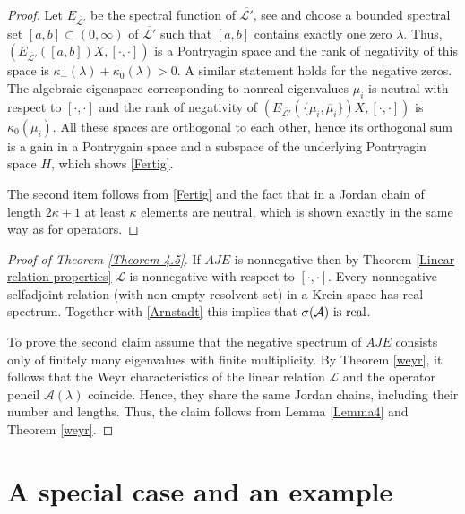 \documentclass{birkjour}
\theoremstyle{definition}
\theoremstyle{remark}
\newtheorem{rem}[thm]{Remark}
\numberwithin{equation}{section}
\newcommand{\R}{\mathbb R}
\newcommand{\A}{\mathcal A}
\newcommand{\Ll}{\mathcal L}
\begin{document}
\begin{proof}
Let $E_{\overline{\Ll'}}$ be the spectral function of $\overline{\Ll'}$, see \cite{KP15} and choose a bounded spectral set $[a,b] \subset (0,\infty)$ of $\overline{\Ll'}$ such that $[a,b]$ contains exactly one zero $\lambda.$ Thus, $(E_{\overline{\Ll'}}([a,b])X,[\cdot, \cdot])$ is a Pontryagin space and the rank of negativity of this space
is $\kappa_-(\lambda)+\kappa_0(\lambda)>0$. A similar statement holds for the negative zeros. The algebraic eigenspace corresponding to nonreal eigenvalues $\mu_i$ is neutral with respect to $[\cdot, \cdot]$ and the rank of negativity of $(E_{\overline{\Ll'}}(\{\mu_i, \overline{\mu}_i\})X,[\cdot, \cdot])$ is $\kappa_0(\mu_i)$. All these spaces are orthogonal to each other, hence its orthogonal sum is a gain in a Pontrygain space and a subspace of the underlying Pontryagin space $H$, which shows \eqref{Fertig}.

The second item follows from \eqref{Fertig} and the fact that in a Jordan chain of length $2\kappa +1$ at least $\kappa$ elements are neutral, which is shown exactly in the same way as for operators.
\end{proof}
\begin{proof}[Proof of Theorem \ref{Theorem 4.5}]
If $AJE$ is nonnegative then by Theorem \ref{Linear relation properties} $\Ll$ is nonnegative with respect to $[\cdot, \cdot]$. Every nonnegative selfadjoint relation
(with non empty resolvent set) in a Krein space has real spectrum. Together with \eqref{Arnstadt} this implies that $\sigma(\A) \ \hbox{is real}$.

To prove the second claim assume that the negative spectrum of $AJE$ consists only of finitely many eigenvalues with finite multiplicity.  By Theorem \ref{weyr}, it follows that the Weyr characteristics of the linear relation $\Ll$ and the operator pencil $\A(\lambda)$ coincide. Hence, they share the same Jordan chains, including their number and lengths.  Thus, the claim follows from Lemma \ref{Lemma4}
and  Theorem \ref{weyr}.
\end{proof}



\section{A special case and an example}
\end{document}
